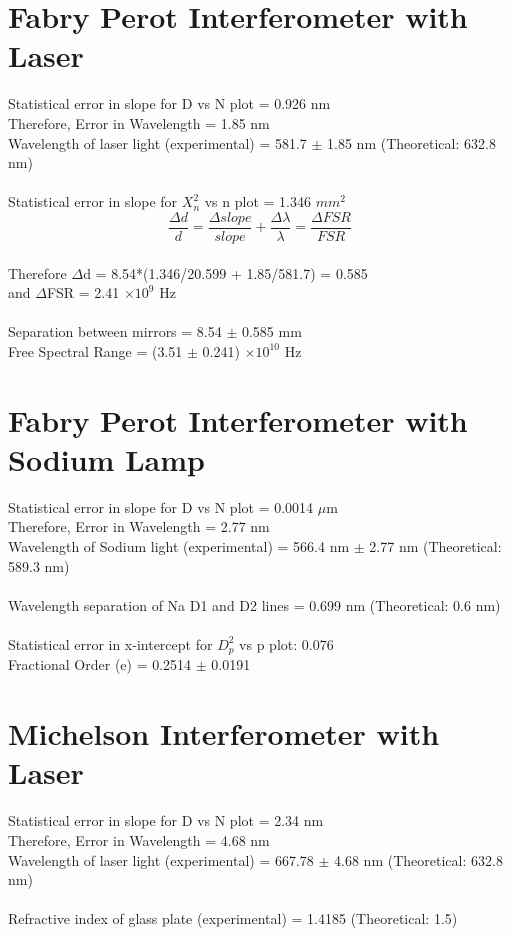 \documentclass[12pt]{report}
\begin{document}
	\section{Fabry Perot Interferometer with Laser}
	Statistical error in slope for D vs N plot = 0.926 nm\\
	Therefore, Error in Wavelength = 1.85 nm\\
	Wavelength of laser light (experimental) = 581.7 $\pm$ 1.85 nm (Theoretical: 632.8 nm)\\ \\
	Statistical error in slope for $X_n^2$ vs n plot = 1.346 $mm^2$\\
	$$\frac{\Delta d}{d} = \frac{\Delta slope}{slope} + \frac{\Delta\lambda}{\lambda} = \frac{\Delta FSR}{FSR}$$\\
	Therefore $\Delta$d = 8.54*(1.346/20.599 + 1.85/581.7) = 0.585\\
	and $\Delta$FSR = 2.41 $\times10^{9}$ Hz\\ \\
	Separation between mirrors = 8.54 $\pm$ 0.585 mm\\
	Free Spectral Range = (3.51 $\pm$ 0.241) $\times10^{10}$ Hz\\
	\section{Fabry Perot Interferometer with Sodium Lamp}
	Statistical error in slope for D vs N plot = 0.0014 $\mu$m\\
	Therefore, Error in Wavelength = 2.77 nm\\
	Wavelength of Sodium light (experimental) = 566.4 nm $\pm$ 2.77 nm (Theoretical: 589.3 nm)\\ \\
	Wavelength separation of Na D1 and D2 lines = 0.699 nm (Theoretical: 0.6 nm)\\ \\
	Statistical error in x-intercept for $D_p^2$ vs p plot: 0.076\\
	Fractional Order (e) = 0.2514 $\pm$ 0.0191\\
	\section{Michelson Interferometer with Laser}
	Statistical error in slope for D vs N plot = 2.34 nm\\
	Therefore, Error in Wavelength = 4.68 nm\\
	Wavelength of laser light (experimental) = 667.78 $\pm$ 4.68 nm (Theoretical: 632.8 nm)\\ \\
	Refractive index of glass plate (experimental) = 1.4185 (Theoretical: 1.5)
\end{document}

